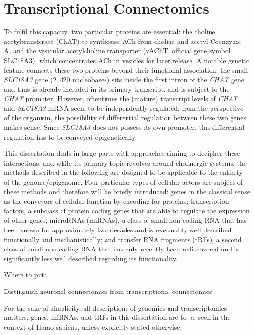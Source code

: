 \section{Transcriptional Connectomics}
 To fulfil this capacity, two particular proteins are essential: the choline acetyltransferase (ChAT) to synthesise ACh from choline and acetyl-Coenzyme A, and the vesicular acetylcholine transporter (vAChT, official gene symbol SLC18A3), which concentrates ACh in vesicles for later release. A notable genetic feature connects these two proteins beyond their functional association: the small \textit{SLC18A3} gene (\mbox{2 420} nucleobases) sits inside the first intron of the \textit{CHAT} gene and thus is already included in its primary transcript, and is subject to the \textit{CHAT} promoter. However, oftentimes the (mature) transcript levels of \textit{CHAT} and \textit{SLC18A3} mRNA seem to be independently regulated; from the perspective of the organism, the possibility of differential regulation between these two genes makes sense. Since \textit{SLC18A3} does not possess its own promoter, this differential regulation has to be conveyed epigenetically. 

This dissertation deals in large parts with approaches aiming to decipher these interactions; and while its primary topic revolves around cholinergic systems, the methods described in the following are designed to be applicable to the entirety of the genome/epigenome. Four particular types of cellular actors are subject of these methods and therefore will be briefly introduced: genes in the classical sense as the conveyors of cellular function by encoding for proteins; transcription factors, a subclass of protein coding genes that are able to regulate the expression of other genes; microRNAs (miRNAs), a class of small non-coding RNA that has been known for approximately two decades and is reasonably well described functionally and mechanistically; and transfer RNA fragments (tRFs), a second class of small non-coding RNA that has only recently been rediscovered and is significantly less well described regarding its functionality.

Where to put:

Distinguish neuronal connectomics from transcriptional connectomics

For the sake of simplicity, all descriptions of genomics and transcriptomics matters, genes, miRNAs, and tRFs in this dissertation are to be seen in the context of Homo sapiens, unless explicitly stated otherwise.

